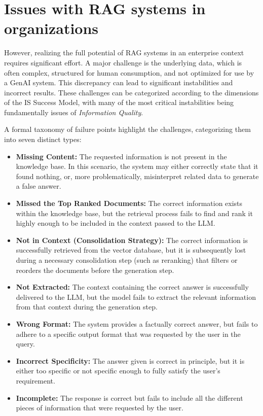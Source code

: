 \documentclass[
	english,
	ruledheaders=section,%
	class=report,%
	thesis={type=bachelor},%
	accentcolor=1b,%
	custommargins=true,%
	marginpar=false,%
	parskip=half-,%
	fontsize=11pt,%
	DIV=14,
]{tudapub}
\begin{document}
\section{Issues with RAG systems in organizations}
However, realizing the full potential of RAG systems in an enterprise context requires significant effort. A major challenge is the underlying data, which is often complex, structured for human consumption, and not optimized for use by a GenAI system. This discrepancy can lead to significant instabilities and incorrect results. These challenges can be categorized according to the dimensions of the IS Success Model, with many of the most critical instabilities being fundamentally issues of \textit{Information Quality}.

A formal taxonomy of failure points highlight the challenges, categorizing them into seven distinct types:

\begin{itemize}
    \item \textbf{Missing Content:} The requested information is not present in the knowledge base. In this scenario, the system may either correctly state that it found nothing, or, more problematically, misinterpret related data to generate a false answer.

    \item \textbf{Missed the Top Ranked Documents:} The correct information exists within the knowledge base, but the retrieval process fails to find and rank it highly enough to be included in the context passed to the LLM.

    \item \textbf{Not in Context (Consolidation Strategy):} The correct information is successfully retrieved from the vector database, but it is subsequently lost during a necessary consolidation step (such as reranking) that filters or reorders the documents before the generation step.

    \item \textbf{Not Extracted:} The context containing the correct answer is successfully delivered to the LLM, but the model fails to extract the relevant information from that context during the generation step.

    \item \textbf{Wrong Format:} The system provides a factually correct answer, but fails to adhere to a specific output format that was requested by the user in the query.

    \item \textbf{Incorrect Specificity:} The answer given is correct in principle, but it is either too specific or not specific enough to fully satisfy the user's requirement.

    \item \textbf{Incomplete:} The response is correct but fails to include all the different pieces of information that were requested by the user.
\end{itemize}
\end{document}
